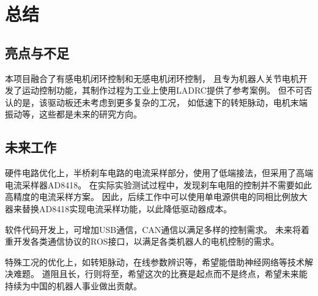 ﻿\documentclass[12pt,a4paper]{article}
\begin{document}



\clearpage

\newpage
\section{总结}
\subsection{亮点与不足}
本项目融合了有感电机闭环控制和无感电机闭环控制，
且专为机器人关节电机开发了运动控制功能，其制作过程为工业上使用LADRC提供了参考案例。
但不可否认的是，该驱动板还未考虑到更多复杂的工况，
如低速下的转矩脉动，电机末端振动等，这些都是未来的研究方向。

\subsection{未来工作}
硬件电路优化上，半桥刹车电路的电流采样部分，使用了低端接法，但采用了高端电流采样器AD8418。
在实际实验测试过程中，发现刹车电阻的控制并不需要如此高精度的电流采样方案。
因此，后续工作中可以使用单电源供电的同相比例放大器来替换AD8418实现电流采样功能，以此降低驱动器成本。

软件代码开发上，可增加USB通信，CAN通信以满足多样的控制需求\cite{Rohman2021}。
未来将着重开发各类通信协议的ROS接口，以满足各类机器人的电机控制的需求。

特殊工况的优化上，如转矩脉动，在线参数辨识等，希望能借助神经网络\cite{Zhao2022}等技术解决难题。
道阻且长，行则将至，希望这次的比赛是起点而不是终点，希望未来能持续为中国的机器人事业做出贡献。





\end{document}
